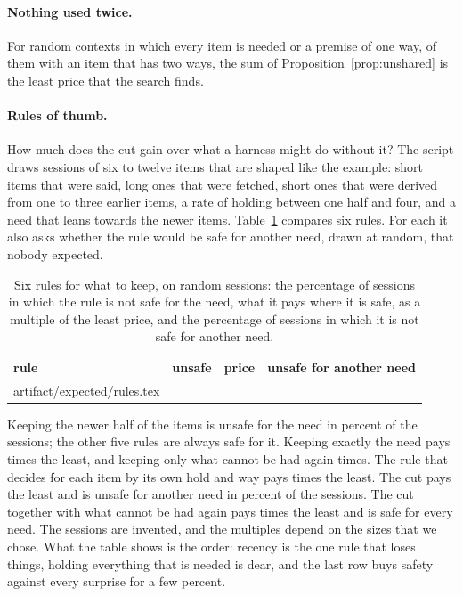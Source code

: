 \documentclass[acmsmall,nonacm,screen]{acmart}
\makeatletter
\newcommand{\claim}[2]{#2}
\newcommand{\rows}[1]{\@@input artifact/expected/#1.tex }
\makeatother
\begin{document}
\paragraph{Nothing used twice.} \claim{unshared}{For \exUnshared{} random contexts in which
every item is needed or a premise of one way, \exWithChoice{} of them with an item that has
two ways, the sum of Proposition~\ref{prop:unshared} is the least price that the search
finds.}

\paragraph{Rules of thumb.} How much does the cut gain over what a harness might do without
it? The script draws \exSessions{} sessions of six to twelve items that are shaped like the
example: short items that were said, long ones that were fetched, short ones that were
derived from one to three earlier items, a rate of holding between one half and four, and a
need that leans towards the newer items. Table~\ref{tab:rules} compares six rules. For each
it also asks whether the rule would be safe for another need, drawn at random, that nobody
expected.

\begin{table}
\caption{Six rules for what to keep, on random sessions: the percentage of sessions in which
the rule is not safe for the need, what it pays where it is safe, as a multiple of the least
price, and the percentage of sessions in which it is not safe for another need.}\label{tab:rules}
\begin{tabular}{lrrr}
\toprule
rule & unsafe & price & unsafe for another need \\
\midrule
\rows{rules}
\bottomrule
\end{tabular}
\end{table}

\claim{rules}{Keeping the newer half of the items is unsafe for the need in
\exRuleNewestUnsafe{} percent of the sessions; the other five rules are always safe for it.
Keeping exactly the need pays \exRuleNeed{} times the least, and keeping only what cannot be
had again \exRulePins{} times. The rule that decides for each item by its own hold and way
pays \exRuleOwn{} times the least. The cut pays the least and is unsafe for another need in
\exRuleCutSurprised{} percent of the sessions. The cut together with what cannot be had
again pays \exRuleBoth{} times the least and is safe for every need.} The sessions are
invented, and the multiples depend on the sizes that we chose. What the table shows is the
order: recency is the one rule that loses things, holding everything that is needed is dear,
and the last row buys safety against every surprise for a few percent.
\end{document}
